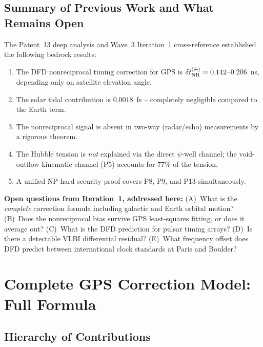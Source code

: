 \documentclass[aps,prd,twocolumn,superscriptaddress,nofootinbib]{revtex4-2}
\newcommand{\deltaT}{\delta t_{\rm NR}}
\begin{document}
\subsection{Summary of Previous Work and What Remains Open}

The Patent~13 deep analysis and Wave~3 Iteration~1 cross-reference
established the following bedrock results:

\begin{enumerate}
\item The DFD nonreciprocal timing correction for GPS is
      $\deltaT^{(\oplus)} = 0.142$--$0.206$~ns, depending only on
      satellite elevation angle.

\item The solar tidal contribution is $0.0018$~fs -- completely
      negligible compared to the Earth term.

\item The nonreciprocal signal is absent in two-way (radar/echo)
      measurements by a rigorous theorem.

\item The Hubble tension is \emph{not} explained via the direct
      $\psi$-well channel; the void-outflow kinematic channel (P5)
      accounts for 77\% of the tension.

\item A unified NP-hard security proof covers P8, P9, and P13
      simultaneously.
\end{enumerate}

\textbf{Open questions from Iteration~1, addressed here:}
(A)~What is the \emph{complete} correction formula including galactic
and Earth orbital motion?
(B)~Does the nonreciprocal bias survive GPS least-squares fitting, or
does it average out?
(C)~What is the DFD prediction for pulsar timing arrays?
(D)~Is there a detectable VLBI differential residual?
(E)~What frequency offset does DFD predict between international
clock standards at Paris and Boulder?

\section{Complete GPS Correction Model: Full Formula}

\subsection{Hierarchy of Contributions}
\end{document}
